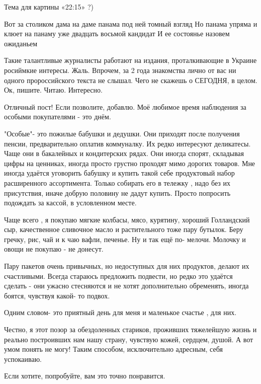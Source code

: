 \begin{itemize}
Тема для картины «22:15» ?)


Вот за столиком дама на даме панама под ней томный взгляд
Но панама упряма и клюет на панаму уже двадцать восьмой кандидат
И ее состоянье назовем ожиданьем


Такие талантливые журналисты работают на издания, проталкивающие в Украине росиймкие интересы.
Жаль.
Впрочем, за 2 года знакомства лично от вас ни одного пророссийского текста не слышал.
Чего не скажешь о СЕГОДНЯ, в целом.
Ок, пишите. Читаю. Интересно.


Отличный пост!
Если позволите, добавлю.
Моё любимое время наблюдения за особыми покупателями - это днём.

"Особые"- это пожилые бабушки и дедушки. Они приходят после получения пенсии,
предварительно оплатив коммуналку. Их редко интересуют деликатесы. Чаще они в
бакалейных и кондитерских рядах. Они иногда спорят, складывая цифры на
ценниках, иногда просто грустно проходят мимо дорогих товаров. Мне иногда
удаётся уговорить бабушку и купить такой себе продуктовый набор расширенного
ассортимента. Только собирать его в тележку , надо без их присутствия, иначе
добрую половину не дадут купить. Просто попросить подождать за кассой, в
условленном месте.

Чаще всего , я покупаю мягкие колбасы, мясо, курятину, хороший Голландский сыр,
качественное сливочное масло и растительного тоже пару бутылок. Беру гречку,
рис, чай и к чаю вафли, печенье. Ну и так ещё по- мелочи. Молочку и овощи не
покупаю - не донесут.

Пару пакетов очень привычных, но недоступных для них продуктов, делают их
счастливыми. Всегда стараюсь предложить подвести, но редко это удаётся сделать
- они ужасно стесняются и не хотят дополнительно обременять, иногда боятся,
чувствуя какой- то подвох.

Одним словом- это приятный день для меня и маленькое счастье , для них.

Честно, я этот позор за обездоленных стариков, проживших тяжелейшую жизнь и
реально построивших нам нашу страну, чувствую кожей, сердцем, душой. А вот умом
понять не могу! Таким способом, исключительно адресным, себя успокаиваю.

Если хотите, попробуйте, вам это точно понравится.



\end{itemize}
